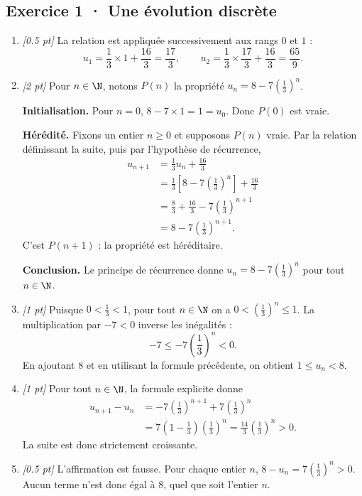 \subsection*{Exercice 1 · Une évolution discrète}\begin{enumerate}

\item \textit{[\num{0,5} pt]} La relation est appliquée successivement aux rangs $0$ et $1$ :\[u_1=\frac{1}{3}\times 1+\frac{16}{3}=\frac{17}{3},\qquad u_2=\frac{1}{3}\times \frac{17}{3}+\frac{16}{3}=\frac{65}{9}.\]

\item \textit{[2 pt]} Pour $n\in\N$, notons $P(n)$ la propriété $u_n=8-7\left(\frac{1}{3}\right)^n$.
\par\smallskip\textbf{Initialisation.} Pour $n=0$, $8-7\times1=1=u_0$. Donc $P(0)$ est vraie.
\par\smallskip\textbf{Hérédité.} Fixons un entier $n\ge0$ et supposons $P(n)$ vraie. Par la relation définissant la suite, puis par l'hypothèse de récurrence,
\[\begin{aligned}u_{n+1}&=\frac{1}{3}u_n+\frac{16}{3}\\
&=\frac{1}{3}\left[8-7\left(\frac{1}{3}\right)^n\right]+\frac{16}{3}\\
&=\frac{8}{3}+\frac{16}{3}-7\left(\frac{1}{3}\right)^{n+1}\\
&=8-7\left(\frac{1}{3}\right)^{n+1}.
\end{aligned}\]
C'est $P(n+1)$ : la propriété est héréditaire.
\par\smallskip\textbf{Conclusion.} Le principe de récurrence donne $u_n=8-7\left(\frac{1}{3}\right)^n$ pour tout $n\in\N$.

\item \textit{[1 pt]} Puisque $0<\frac{1}{3}<1$, pour tout $n\in\N$ on a $0<(\frac{1}{3})^n\le1$. La multiplication par $-7<0$ inverse les inégalités :
\[-7\le-7(\frac{1}{3})^n<0.\]
En ajoutant $8$ et en utilisant la formule précédente, on obtient $1\le u_n<8$.

\item \textit{[1 pt]} Pour tout $n\in\N$, la formule explicite donne
\[\begin{aligned}u_{n+1}-u_n&=-7(\frac{1}{3})^{n+1}+7(\frac{1}{3})^n\\&=7(1-\frac{1}{3})(\frac{1}{3})^n=\frac{14}{3}(\frac{1}{3})^n>0.\end{aligned}\]
La suite est donc strictement croissante.

\item \textit{[\num{0,5} pt]} L'affirmation est fausse. Pour chaque entier $n$, $8-u_n=7(\frac{1}{3})^n>0$. Aucun terme n'est donc égal à $8$, quel que soit l'entier $n$.

\end{enumerate}


